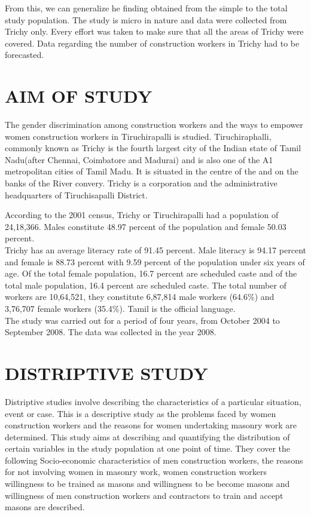 \documentclass[12pt]{report}
\newcommand{\NI}{\noindent}
\begin{document}
	\NI From this, we can generalize he finding obtained from the simple to the total study population. The study is micro in nature and data were collected from Trichy only. Every effort was taken to make sure that all the areas of Trichy were covered. Data regarding the number of construction workers in Trichy had to be forecasted.
	
	\section{AIM OF STUDY}
	The gender discrimination among construction workers and the ways to empower women construction workers in Tiruchirapalli is studied. Tiruchiraphalli, commonly known as Trichy is the fourth largest city of the Indian state of Tamil Nadu(after Chennai, Coimbatore and Madurai) and is also one of the A1 metropolitan cities of Tamil Madu. It is situated in the centre of the and on the banks of the River convery. Trichy is a corporation and the administrative headquarters of Tiruchisapalli District.
	
	\NI According to the 2001 census, Trichy or Tiruchirapalli had a population of 24,18,366. Males constitute 48.97 percent of the population and female 50.03 percent.\\
	
	\NI Trichy has an average literacy rate of 91.45 percent. Male literacy is 94.17 percent and female is 88.73 percent with 9.59 percent of the population under six years of age. Of the total female population, 16.7 percent are scheduled caste and of the total male population, 16.4 percent are scheduled caste. The total number of workers are 10,64,521, they constitute 6,87,814 male workers (64.6\%) and 3,76,707 female workers (35.4\%). Tamil is the official language.\\
	
	\NI The study was carried out for a period of four years, from October 2004 to September 2008. The data was collected in the year 2008.
	
	\section{DISTRIPTIVE STUDY}
	Distriptive studies involve describing the characteristics of a particular situation, event or case. This is a descriptive study as the problems faced by women construction workers and the reasons for women undertaking masonry work are determined. This study aims at describing and quantifying the distribution of certain variables in the study population at one point of time. They cover the following Socio-economic characteristics of men construction workers, the reasons for not involving women in masonry work, women construction workers willingness to be trained as masons and willingness to be become masons and willingness of men construction workers and contractors to train and accept masons are described.
	
\end{document}
